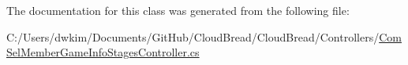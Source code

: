 The documentation for this class was generated from the following file\+:\begin{DoxyCompactItemize}
\item 
C\+:/\+Users/dwkim/\+Documents/\+Git\+Hub/\+Cloud\+Bread/\+Cloud\+Bread/\+Controllers/\hyperlink{_com_sel_member_game_info_stages_controller_8cs}{Com\+Sel\+Member\+Game\+Info\+Stages\+Controller.\+cs}\end{DoxyCompactItemize}
